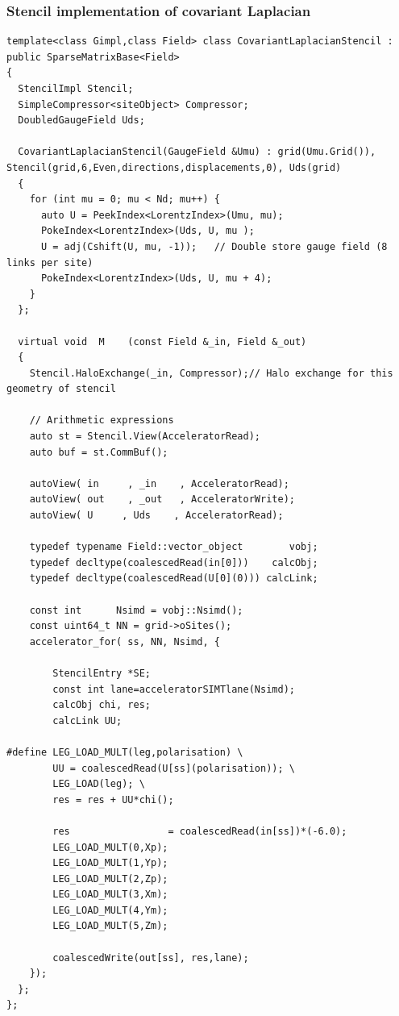 \documentclass[pdf,ps,8pt]{beamer}
\newcommand{\miniscule}{\fontsize{3pt}{4pt}\selectfont}
\begin{document}
\begin{frame}[fragile]\small\frametitle{ Stencil implementation of covariant Laplacian}
{\miniscule
\begin{verbatim}
template<class Gimpl,class Field> class CovariantLaplacianStencil : public SparseMatrixBase<Field>
{
  StencilImpl Stencil;
  SimpleCompressor<siteObject> Compressor;
  DoubledGaugeField Uds;

  CovariantLaplacianStencil(GaugeField &Umu) : grid(Umu.Grid()), Stencil(grid,6,Even,directions,displacements,0), Uds(grid)
  {
    for (int mu = 0; mu < Nd; mu++) {
      auto U = PeekIndex<LorentzIndex>(Umu, mu);
      PokeIndex<LorentzIndex>(Uds, U, mu );
      U = adj(Cshift(U, mu, -1));   // Double store gauge field (8 links per site)
      PokeIndex<LorentzIndex>(Uds, U, mu + 4);
    }
  };

  virtual void  M    (const Field &_in, Field &_out)
  {
    Stencil.HaloExchange(_in, Compressor);// Halo exchange for this geometry of stencil

    // Arithmetic expressions
    auto st = Stencil.View(AcceleratorRead);
    auto buf = st.CommBuf();

    autoView( in     , _in    , AcceleratorRead);
    autoView( out    , _out   , AcceleratorWrite);
    autoView( U     , Uds    , AcceleratorRead);

    typedef typename Field::vector_object        vobj;
    typedef decltype(coalescedRead(in[0]))    calcObj;
    typedef decltype(coalescedRead(U[0](0))) calcLink;

    const int      Nsimd = vobj::Nsimd();
    const uint64_t NN = grid->oSites();
    accelerator_for( ss, NN, Nsimd, {

        StencilEntry *SE;
        const int lane=acceleratorSIMTlane(Nsimd);
        calcObj chi, res;
        calcLink UU;

#define LEG_LOAD_MULT(leg,polarisation)	\
        UU = coalescedRead(U[ss](polarisation)); \
        LEG_LOAD(leg); \
        res = res + UU*chi();			        
	
        res                 = coalescedRead(in[ss])*(-6.0);
        LEG_LOAD_MULT(0,Xp);
        LEG_LOAD_MULT(1,Yp);
        LEG_LOAD_MULT(2,Zp);
        LEG_LOAD_MULT(3,Xm);
        LEG_LOAD_MULT(4,Ym);
        LEG_LOAD_MULT(5,Zm);

        coalescedWrite(out[ss], res,lane);
    });
  };
};
\end{verbatim}
}
\end{frame}
\end{document}
